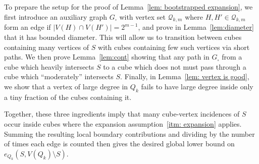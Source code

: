 \documentclass{article}
\theoremstyle{definition}
\newcommand{\cQ}{\mathcal{Q}}
\begin{document}
To prepare the setup for the proof of Lemma~\ref{lem: bootstrapped expansion}, we first introduce an auxiliary graph $G_{\square}$ with vertex set $\cQ_{k,m}$ where $H,H'\in\cQ_{k,m}$ form an edge if $|V(H)\cap V(H')|=2^{m-1}$, 
and prove in Lemma~\ref{lem:diameter} that it has bounded diameter. This will allow us to transition between cubes containing many vertices of $S$ with cubes containing few such vertices via short paths. 
We then prove Lemma~\ref{lem:cont} showing that any path in $G_{\square}$ from a cube which heavily intersects $S$ to a cube which does not must pass through a cube which ``moderately'' intersects $S$. 
Finally, in Lemma~\ref{lem: vertex is good}, we show that a vertex of large degree in $Q_k$ fails to have large degree inside only a tiny fraction of the cubes containing it.

Together, these three ingredients imply that many cube-vertex incidences of $S$ occur inside cubes where the expansion assumption~\ref{itm: expansion} applies. 
Summing the resulting local boundary contributions and dividing by the number of times each edge is counted then gives the desired global lower bound on $e_{Q_k}(S,V(Q_k)\setminus S)$.

\end{document}
